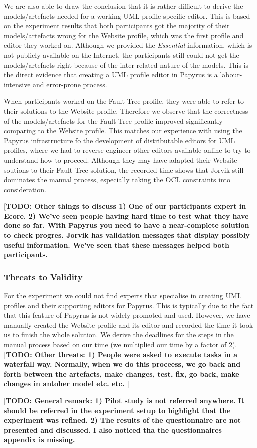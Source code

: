 We are also able to draw the conclusion that it is rather difficult to derive the models/artefacts needed for a working UML profile-specific editor. 
This is based on the experiment results that both participants got the majority of their models/artefacts wrong for the Website profile, which was the first profile and editor they worked on.
Although we provided the \textit{Essential} information, which is not publicly available on the Internet, the participants still could not get the models/artefacts right because of the inter-related nature of the models.
This is the direct evidence that creating a UML profile editor in Papyrus is a labour-intensive and error-prone process.

When participants worked on the Fault Tree profile, they were able to refer to their solutions to the Website profile. 
Therefore we observe that the correctness of the models/artefacts for the Fault Tree profile improved significantly comparing to the Website profile. This matches our experience with using the Papyrus infrastructure fo the development of distributable editors for UML profiles, where we had to reverse engineer other editors available online to try to understand how to proceed.
Although they may have adapted their Website soutions to their Fault Tree solution, the recorded time shows that Jorvik still dominates the manual process, especially taking the OCL constraints into consideration.

[\textbf{TODO: Other things to discuss 1) One of our participants expert in Ecore. 2) We've seen people having hard time to test what they have done so far. With Papyrus you need to have a near-complete solution to check progres. Jorvik has validation messages that display possibly useful information. We've seen that these messages helped both participants. }]

\subsubsection{Threats to Validity}
For the experiment we could not find experts that specialise in creating UML profiles and their supporting editors for Papyrus. 
This is typically due to the fact that this feature of Papyrus is not widely promoted and used.
However, we have manually created the Website profile and its editor and recorded the time it took us to finish the whole solution. 
We derive the deadlines for the steps in the manual process based on our time (we multiplied our time by a factor of 2). 
\textbf{[TODO: Other threats: 1) People were asked to execute tasks in a waterfall way. Normally, when we do this proceess, we go back and forth between the artefacts, make changes, test, fix, go back, make changes in antoher model etc. etc. ]}



[\textbf{TODO: General remark: 1) Pilot study is not referred anywhere. It should be referred in the experiment setup to highlight that the experiment was refined. 2) The results of the questionnaire are not presented and discussed. I also noticed tha the questionnaires appendix is missing.}]
